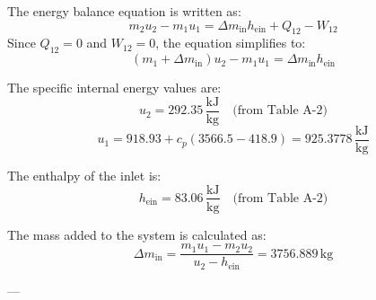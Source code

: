 The energy balance equation is written as:  
\[
m_2 u_2 - m_1 u_1 = \Delta m_{\text{in}} h_{\text{ein}} + Q_{12} - W_{12}
\]  
Since \( Q_{12} = 0 \) and \( W_{12} = 0 \), the equation simplifies to:  
\[
(m_1 + \Delta m_{\text{in}}) u_2 - m_1 u_1 = \Delta m_{\text{in}} h_{\text{ein}}
\]  

The specific internal energy values are:  
\[
u_2 = 292.35 \, \frac{\text{kJ}}{\text{kg}} \quad \text{(from Table A-2)}
\]  
\[
u_1 = 918.93 + c_p (3566.5 - 418.9) = 925.3778 \, \frac{\text{kJ}}{\text{kg}}
\]  

The enthalpy of the inlet is:  
\[
h_{\text{ein}} = 83.06 \, \frac{\text{kJ}}{\text{kg}} \quad \text{(from Table A-2)}
\]  

The mass added to the system is calculated as:  
\[
\Delta m_{\text{in}} = \frac{m_1 u_1 - m_2 u_2}{u_2 - h_{\text{ein}}} = 3756.889 \, \text{kg}
\]  

---